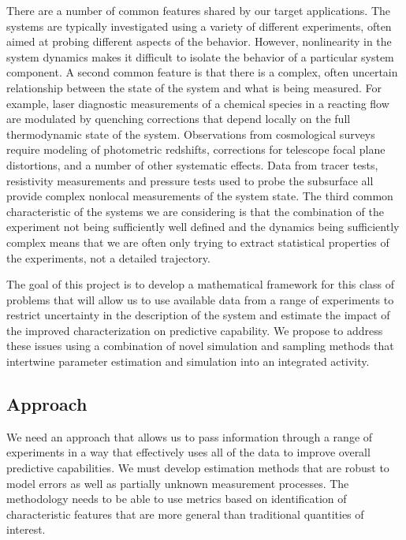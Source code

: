 \documentclass[11pt]{article}
\begin{document}
There are a number of common features shared by our target applications.
The systems are typically investigated using a variety of different experiments, often
aimed at probing different aspects of the behavior.
However, nonlinearity in the system dynamics makes it difficult to isolate the behavior of
a particular system component.
A second common feature is that there is a complex, often uncertain relationship between the state of the system and
what is being measured. For example, laser diagnostic measurements
of a chemical species in a reacting flow are modulated by quenching corrections that depend locally on the full
thermodynamic state of the system.
Observations from cosmological surveys require modeling of photometric redshifts, corrections for telescope focal plane distortions, and a number of other systematic effects.
Data from tracer tests, resistivity measurements and pressure tests used to probe the subsurface
all provide complex nonlocal measurements of the system state. 
The third common characteristic of the systems we are considering is that the combination of the experiment not being sufficiently well defined 
and the dynamics being sufficiently complex means that we are often only trying to extract
statistical properties of the experiments, not a detailed trajectory.

The goal of this project is to develop a
mathematical framework for this class of problems that will allow us to use available data from a range
of experiments to restrict
uncertainty in the description of the system and estimate the impact of the improved characterization
on predictive capability.
We propose to address these issues using a combination of novel simulation and sampling methods that
intertwine parameter estimation and simulation into an integrated activity.

\subsection*{Approach}
We need an approach that allows us to pass
information through a range of experiments in a way that effectively uses all of the data
to improve overall predictive capabilities.
We must develop estimation methods that are robust to model errors as well as partially unknown measurement processes.
The methodology needs to be able to use metrics based on identification of
characteristic features that are more general than
traditional quantities of interest.
\end{document}
